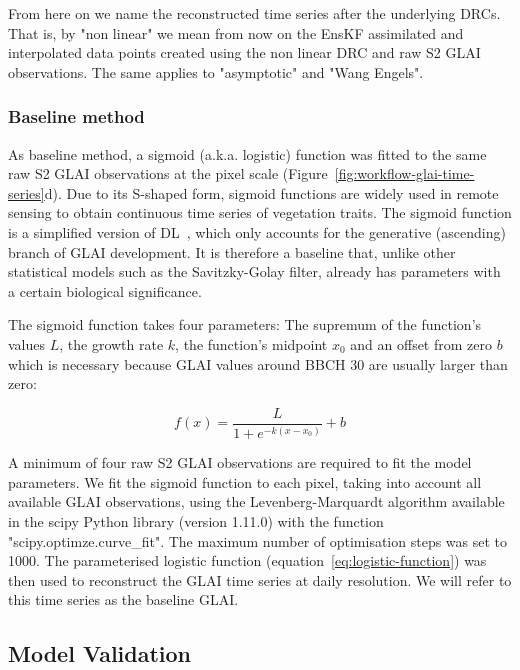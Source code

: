 From here on we name the reconstructed time series after the underlying \gls{DRC}s. That is, by "non linear" we mean from now on the \gls{EnsKF} assimilated and interpolated data points created using the non linear \gls{DRC} and raw \gls{S2} \gls{GLAI} observations. The same applies to "asymptotic" and "Wang Engels".

\subsubsection{Baseline method}
\label{subsubsec:baseline-method}
As baseline method, a sigmoid (a.k.a. logistic) function was fitted to the same raw \gls{S2} \gls{GLAI} observations at the pixel scale (Figure~\ref{fig:workflow-glai-time-series}d). Due to its S-shaped form, sigmoid functions are widely used in remote sensing to obtain continuous time series of vegetation traits. The sigmoid function is a simplified version of \gls{DL}~\citep{beck_improved_2006}, which only accounts for the generative (ascending) branch of \gls{GLAI} development. It is therefore a baseline that, unlike other statistical models such as the Savitzky-Golay filter, already has parameters with a certain biological significance.

The sigmoid function takes four parameters: The supremum of the function's values $L$, the growth rate $k$, the function's midpoint $x_0$ and an offset from zero $b$ which is necessary because \gls{GLAI} values around \gls{BBCH} 30 are usually larger than zero:

\begin{equation}
\label{eq:logistic-function}
    f(x) = \frac{L}{1 + e^{-k(x-x_0)}} + b
\end{equation}

A minimum of four raw \gls{S2} \gls{GLAI} observations are required to fit the model parameters. We fit the sigmoid function to each pixel, taking into account all available \gls{GLAI} observations, using the Levenberg-Marquardt algorithm available in the scipy Python library (version 1.11.0) with the function "scipy.optimze.curve\_fit". The maximum number of optimisation steps was set to 1000. The parameterised logistic function (equation~\ref{eq:logistic-function}) was then used to reconstruct the \gls{GLAI} time series at daily resolution. We will refer to this time series as the baseline \gls{GLAI}.

\subsection{Model Validation}

